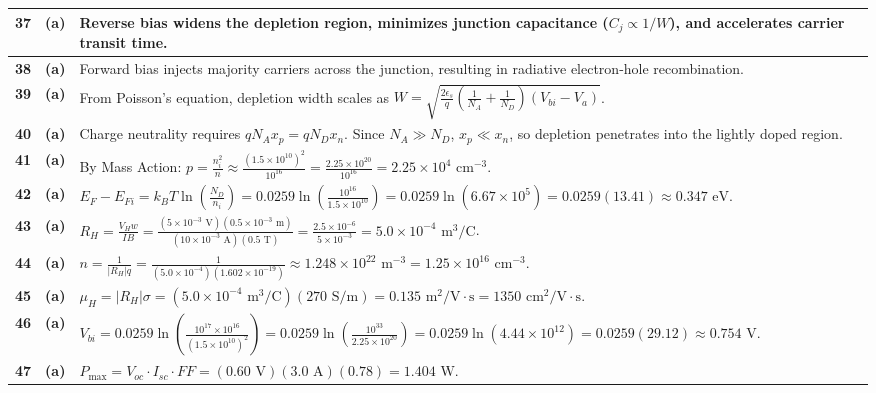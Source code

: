 {\begin{tabularx}{\textwidth}{|c|c|X|}
\textbf{37} & \textbf{(a)} & Reverse bias widens the depletion region, minimizes junction capacitance ($C_j \propto 1/W$), and accelerates carrier transit time. \\ \hline
\textbf{38} & \textbf{(a)} & Forward bias injects majority carriers across the junction, resulting in radiative electron-hole recombination. \\ \hline
\textbf{39} & \textbf{(a)} & From Poisson's equation, depletion width scales as $W = \sqrt{\frac{2\epsilon_s}{q}\left(\frac{1}{N_A} + \frac{1}{N_D}\right)(V_{bi} - V_a)}$. \\ \hline
\textbf{40} & \textbf{(a)} & Charge neutrality requires $q N_A x_p = q N_D x_n$. Since $N_A \gg N_D$, $x_p \ll x_n$, so depletion penetrates into the lightly doped region. \\ \hline
\textbf{41} & \textbf{(a)} & By Mass Action: $p = \frac{n_i^2}{n} \approx \frac{(1.5 \times 10^{10})^2}{10^{16}} = \frac{2.25 \times 10^{20}}{10^{16}} = 2.25 \times 10^4\text{ cm}^{-3}$. \\ \hline
\textbf{42} & \textbf{(a)} & $E_F - E_{Fi} = k_BT \ln\left(\frac{N_D}{n_i}\right) = 0.0259 \ln\left(\frac{10^{16}}{1.5 \times 10^{10}}\right) = 0.0259 \ln(6.67 \times 10^5) = 0.0259(13.41) \approx 0.347\text{ eV}$. \\ \hline
\textbf{43} & \textbf{(a)} & $R_H = \frac{V_H w}{I B} = \frac{(5 \times 10^{-3}\text{ V})(0.5 \times 10^{-3}\text{ m})}{(10 \times 10^{-3}\text{ A})(0.5\text{ T})} = \frac{2.5 \times 10^{-6}}{5 \times 10^{-3}} = 5.0 \times 10^{-4}\text{ m}^3/\text{C}$. \\ \hline
\textbf{44} & \textbf{(a)} & $n = \frac{1}{|R_H| q} = \frac{1}{(5.0 \times 10^{-4})(1.602 \times 10^{-19})} \approx 1.248 \times 10^{22}\text{ m}^{-3} = 1.25 \times 10^{16}\text{ cm}^{-3}$. \\ \hline
\textbf{45} & \textbf{(a)} & $\mu_H = |R_H|\sigma = (5.0 \times 10^{-4}\text{ m}^3/\text{C})(270\text{ S/m}) = 0.135\text{ m}^2/\text{V}\cdot\text{s} = 1350\text{ cm}^2/\text{V}\cdot\text{s}$. \\ \hline
\textbf{46} & \textbf{(a)} & $V_{bi} = 0.0259 \ln\left(\frac{10^{17} \times 10^{16}}{(1.5 \times 10^{10})^2}\right) = 0.0259 \ln\left(\frac{10^{33}}{2.25 \times 10^{20}}\right) = 0.0259 \ln(4.44 \times 10^{12}) = 0.0259(29.12) \approx 0.754\text{ V}$. \\ \hline
\textbf{47} & \textbf{(a)} & $P_{\text{max}} = V_{oc} \cdot I_{sc} \cdot FF = (0.60\text{ V})(3.0\text{ A})(0.78) = 1.404\text{ W}$. \\ \hline

\end{tabularx}}
